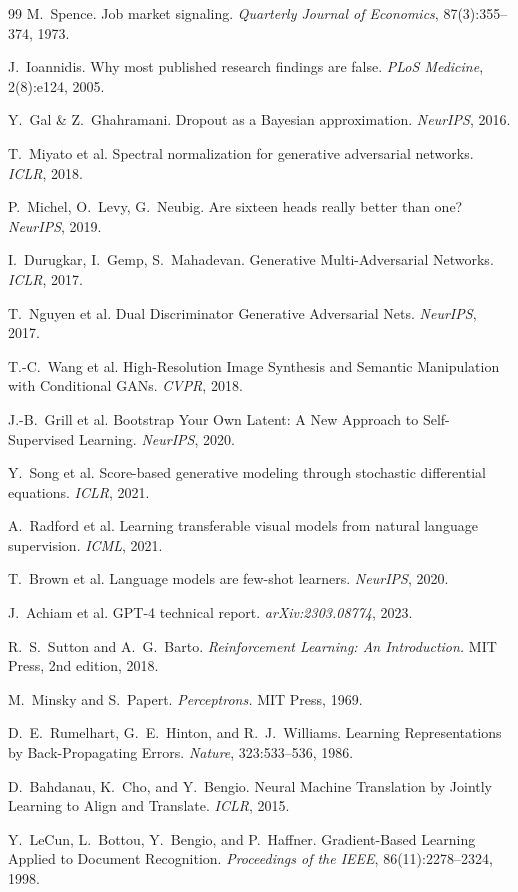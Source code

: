 \documentclass[12pt,a4paper]{article}
\theoremstyle{definition}
\begin{document}
\begin{thebibliography}{99}
 M.~Spence. Job market signaling. \textit{Quarterly Journal of Economics}, 87(3):355--374, 1973.

 J.~Ioannidis. Why most published research findings are false. \textit{PLoS Medicine}, 2(8):e124, 2005.

 Y.~Gal \& Z.~Ghahramani. Dropout as a Bayesian approximation. \textit{NeurIPS}, 2016.

 T.~Miyato et al. Spectral normalization for generative adversarial networks. \textit{ICLR}, 2018.

 P.~Michel, O.~Levy, G.~Neubig. Are sixteen heads really better than one? \textit{NeurIPS}, 2019.

 I.~Durugkar, I.~Gemp, S.~Mahadevan. Generative Multi-Adversarial Networks. \textit{ICLR}, 2017.

 T.~Nguyen et al. Dual Discriminator Generative Adversarial Nets. \textit{NeurIPS}, 2017.

 T.-C.~Wang et al. High-Resolution Image Synthesis and Semantic Manipulation with Conditional GANs. \textit{CVPR}, 2018.

 J.-B.~Grill et al. Bootstrap Your Own Latent: A New Approach to Self-Supervised Learning. \textit{NeurIPS}, 2020.

 Y.~Song et al. Score-based generative modeling through stochastic differential equations. \textit{ICLR}, 2021.

 A.~Radford et al. Learning transferable visual models from natural language supervision. \textit{ICML}, 2021.

 T.~Brown et al. Language models are few-shot learners. \textit{NeurIPS}, 2020.

 J.~Achiam et al. GPT-4 technical report. \textit{arXiv:2303.08774}, 2023.

 R.~S.~Sutton and A.~G.~Barto. \textit{Reinforcement Learning: An Introduction.} MIT Press, 2nd edition, 2018.

 M.~Minsky and S.~Papert. \textit{Perceptrons.} MIT Press, 1969.

 D.~E.~Rumelhart, G.~E.~Hinton, and R.~J.~Williams. Learning Representations by Back-Propagating Errors. \textit{Nature}, 323:533--536, 1986.

 D.~Bahdanau, K.~Cho, and Y.~Bengio. Neural Machine Translation by Jointly Learning to Align and Translate. \textit{ICLR}, 2015.

 Y.~LeCun, L.~Bottou, Y.~Bengio, and P.~Haffner. Gradient-Based Learning Applied to Document Recognition. \textit{Proceedings of the IEEE}, 86(11):2278--2324, 1998.

\end{thebibliography}
\end{document}
